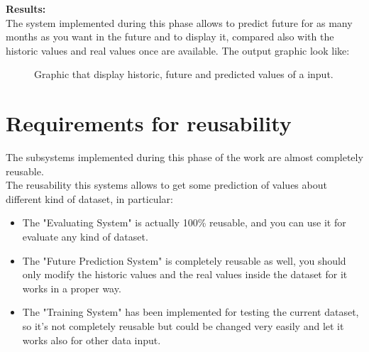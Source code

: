 \newpage 

\textbf{Results:}\\
The system implemented during this phase allows to predict future for as many months as you want in the future and to display it, compared also with the historic values and real values once are available. The output graphic look like:
\begin{figure}[H]
	\centering
    \caption{Graphic that display historic, future and predicted values of a input.}
\end{figure}

\newpage

\section{Requirements for reusability}
The subsystems implemented during this phase of the work are almost completely reusable.\\
The reusability this systems allows to get some prediction of values about different kind of dataset, in particular:
\begin{itemize}
\item The "Evaluating System" is actually 100\% reusable, and you can use it for evaluate any kind of dataset.
\item The "Future Prediction System" is completely reusable as well, you should only modify the historic values and the real values inside the dataset for it works in a proper way.
\item The "Training System" has been implemented for testing the current dataset, so it's not completely reusable but could be changed very easily and let it works also for other data input.
\end{itemize}


